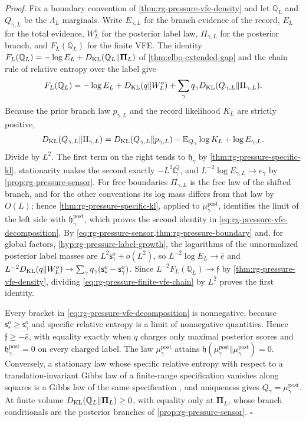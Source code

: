 \noindent\emph{Proof.}
Fix a boundary convention of \cref{thm:rg-pressure-vfe-density} and let
$\mathbb Q_L$ and $Q_{\gamma,L}$ be the $\Lambda_L$ marginals. Write
$E_{\gamma,L}$ for the branch evidence of the record, $E_L$ for the total
evidence, $W^o_L$ for the posterior label law, $\Pi_{\gamma,L}$ for the
posterior branch, and $F_L(\mathbb Q_L)$ for the finite VFE. The identity
$F_L(\mathbb Q_L)=-\log E_L+D_{\mathrm{KL}}(\mathbb Q_L\Vert\boldsymbol\Pi_L)$ of
\cref{thm:elbo-extended-gap} and the chain rule of relative entropy over the
label give
\begin{equation}
 F_L(\mathbb Q_L)=-\log E_L+D_{\mathrm{KL}}(q\Vert W^o_L)
 +\sum_\gamma q_\gamma D_{\mathrm{KL}}(Q_{\gamma,L}\Vert\Pi_{\gamma,L}).
 \label{eq:rg-pressure-finite-vfe-chain}
\end{equation}
Because the prior branch law $p_{\gamma,L}$ and the record likelihood
$K_L$ are strictly positive,
\begin{equation}
 D_{\mathrm{KL}}(Q_{\gamma,L}\Vert\Pi_{\gamma,L})=D_{\mathrm{KL}}(Q_{\gamma,L}\Vert p_{\gamma,L})
 -\mathbb E_{Q_\gamma}\log K_L+\log E_{\gamma,L}.
 \label{eq:rg-pressure-finite-branch-posterior}
\end{equation}
Divide by $L^2$. The first term on the right tends to $\mathfrak h_\gamma$ by
\cref{thm:rg-pressure-specific-kl}, stationarity makes the second exactly
$-L^2\mathfrak l^Q_\gamma$, and $L^{-2}\log E_{\gamma,L}\to e_\gamma$ by
\cref{prop:rg-pressure-sensor}. For free boundaries $\Pi_{\gamma,L}$ is the
free law of the shifted branch, and for the other conventions its log mass
differs from that law by $O(L)$; hence \cref{thm:rg-pressure-specific-kl},
applied to $\mu^{\mathrm{post}}_\gamma$, identifies the limit of the left side
with $\mathfrak h^{\mathrm{post}}_\gamma$, which proves the second identity in
\cref{eq:rg-pressure-vfe-decomposition}. By
\cref{eq:rg-pressure-sensor,thm:rg-pressure-boundary} and, for global factors,
\cref{hyp:rg-pressure-label-growth}, the logarithms of the unnormalized
posterior label masses are $L^2\mathsf s^o_\gamma+o(L^2)$, so
$L^{-2}\log E_L\to\bar e$ and
$L^{-2}D_{\mathrm{KL}}(q\Vert W^o_L)\to\sum_\gamma q_\gamma(\mathsf s^o_*-\mathsf s^o_\gamma)$.
Since $L^{-2}F_L(\mathbb Q_L)\to\mathfrak f$ by
\cref{thm:rg-pressure-vfe-density}, dividing
\cref{eq:rg-pressure-finite-vfe-chain} by $L^2$ proves the first identity.

Every bracket in \cref{eq:rg-pressure-vfe-decomposition} is nonnegative,
because $\mathsf s^o_*\geq\mathsf s^o_\gamma$ and specific relative entropy is
a limit of nonnegative quantities. Hence $\mathfrak f\geq-\bar e$, with equality
exactly when $q$ charges only maximal posterior scores and
$\mathfrak h^{\mathrm{post}}_\gamma=0$ on every charged label. The law
$\mu^{\mathrm{post}}_\gamma$ attains
$\mathfrak h(\mu^{\mathrm{post}}_\gamma\Vert\mu^{\mathrm{post}}_\gamma)=0$.
Conversely, a stationary law whose specific relative entropy with respect to
a translation-invariant Gibbs law of a finite-range specification vanishes
along squares is a Gibbs law of the same specification
\citep[Thm.~15.37]{Georgii1988}, and uniqueness gives
$Q_\gamma=\mu^{\mathrm{post}}_\gamma$. At finite volume
$D_{\mathrm{KL}}(\mathbb Q_L\Vert\boldsymbol\Pi_L)\geq0$, with equality only at
$\boldsymbol\Pi_L$, whose branch conditionals are the posterior branches of
\cref{prop:rg-pressure-sensor}. $\square$

